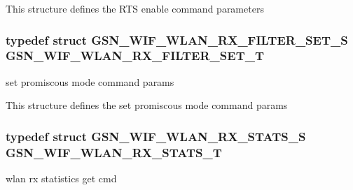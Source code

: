 This structure defines the RTS enable command parameters \hypertarget{a00677_gad632a83292610148499e14031b507f4b}{
\subsubsection[{GSN\_\-WIF\_\-WLAN\_\-RX\_\-FILTER\_\-SET\_\-T}]{\setlength{\rightskip}{0pt plus 5cm}typedef struct {\bf GSN\_\-WIF\_\-WLAN\_\-RX\_\-FILTER\_\-SET\_\-S} {\bf GSN\_\-WIF\_\-WLAN\_\-RX\_\-FILTER\_\-SET\_\-T}}}
\label{a00677_gad632a83292610148499e14031b507f4b}


set promiscous mode command params 

This structure defines the set promiscous mode command params \hypertarget{a00677_ga1bb08fff4c3ba2c6027ad054755e4df2}{
\subsubsection[{GSN\_\-WIF\_\-WLAN\_\-RX\_\-STATS\_\-T}]{\setlength{\rightskip}{0pt plus 5cm}typedef struct {\bf GSN\_\-WIF\_\-WLAN\_\-RX\_\-STATS\_\-S} {\bf GSN\_\-WIF\_\-WLAN\_\-RX\_\-STATS\_\-T}}}
\label{a00677_ga1bb08fff4c3ba2c6027ad054755e4df2}


wlan rx statistics get cmd 

